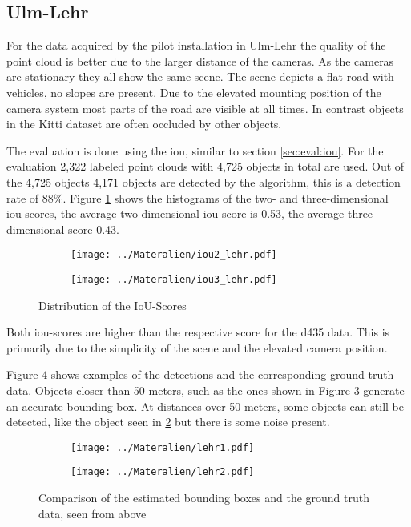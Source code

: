 \subsection{Ulm-Lehr}
For the data acquired by the pilot installation in Ulm-Lehr the quality of the point cloud is better due to the larger distance of the cameras.
As the cameras are stationary they all show the same scene. The scene depicts a flat road with vehicles, no slopes are present. 
Due to the elevated mounting position of the camera system most parts of the road are visible at all times. 
In contrast objects in the Kitti dataset are often occluded by other objects.

The evaluation is done using the \ac{iou}, similar to section \ref{sec:eval:iou}. For the evaluation 2,322 labeled point clouds with 4,725 objects in total are used.
Out of the 4,725 objects 4,171 objects are detected by the algorithm, this is a detection rate of 88\%. 
Figure \ref{fig:eval:iouDistLehr} shows the histograms of the two- and three-dimensional \ac{iou}-scores, the average two dimensional \ac{iou}-score is 0.53, the average three-dimensional-score 0.43.

\begin{figure}[h!]
    \centering
    \begin{subfigure}[c]{0.48\textwidth}
        \texttt{[image: ../Materalien/iou2\_lehr.pdf]}
    \end{subfigure}
    \begin{subfigure}[c]{0.48\textwidth}
        \texttt{[image: ../Materalien/iou3\_lehr.pdf]}
    \end{subfigure}
    \caption{Distribution of the IoU-Scores}
    \label{fig:eval:iouDistLehr}
\end{figure}

Both \ac{iou}-scores are higher than the respective score for the \ac{d435} data. This is primarily due to the simplicity of the scene and the elevated camera position.

Figure \ref{fig:eval:iouLehr} shows examples of the detections and the corresponding ground truth data. Objects closer than 50 meters, such as the ones shown in Figure \ref{fig:eval:iouLehr:2} generate an accurate bounding box. At distances over 50 meters, some objects can still be detected, like the object seen in \ref{fig:eval:iouLehr:1} but there is some noise present.

\begin{figure}[h!]
    \centering
    \begin{subfigure}[c]{0.75\textwidth}
        \texttt{[image: ../Materalien/lehr1.pdf]}
        \subcaption{}
        \label{fig:eval:iouLehr:1}
    \end{subfigure}
    \begin{subfigure}[c]{0.75\textwidth}
        \texttt{[image: ../Materalien/lehr2.pdf]}
        \subcaption{}
        \label{fig:eval:iouLehr:2}
    \end{subfigure}
    \caption{Comparison of the estimated bounding boxes and the ground truth data, seen from above}
    \label{fig:eval:iouLehr}
\end{figure}

